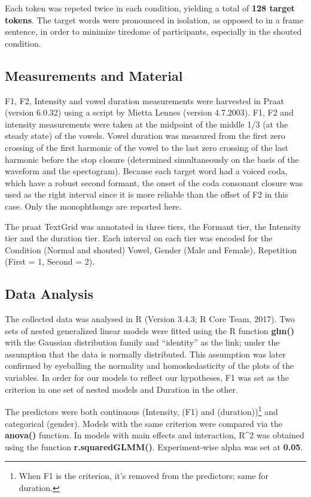 \documentclass[floatsintext,man]{apa6}
\theoremstyle{definition}
\theoremstyle{definition}
\theoremstyle{definition}
\theoremstyle{remark}
\begin{document}
Each token was repeted twice in each condition, yielding a total of
\textbf{128 target tokens}. The target words were pronounced in
isolation, as opposed to in a frame sentence, in order to minimize
tiredome of participants, especially in the shouted condition.

\subsection{Measurements and Material}\label{measurements-and-material}

F1, F2, Intensity and vowel duration measurements were harvested in
Praat (version 6.0.32) using a script by Mietta Lennes (version
4.7.2003). F1, F2 and intensity measurements were taken at the midpoint
of the middle 1/3 (at the steady state) of the vowels. Vowel duration
was measured from the first zero crossing of the first harmonic of the
vowel to the last zero crossing of the last harmonic before the stop
closure (determined simultaneously on the basis of the waveform and the
spectogram). Because each target word had a voiced coda, which have a
robust second formant, the onset of the coda consonant closure was used
as the right interval since it is more reliable than the offset of F2 in
this case. Only the monophthongs are reported here.

The praat TextGrid was annotated in three tiers, the Formant tier, the
Intensity tier and the duration tier. Each interval on each tier was
encoded for the Condition (Normal and shouted) Vowel, Gender (Male and
Female), Repetition (First = 1, Second = 2).

\subsection{Data Analysis}\label{data-analysis}

The collected data was analysed in R (Version 3.4.3; R Core Team, 2017).
Two sets of nested generalized linear models were fitted using the R
function \textbf{glm()} with the Gaussian distribution family and
\enquote{identity} as the link; under the assumption that the data is
normally distributed. This assumption was later confirmed by eyeballing
the normality and homoskedasticity of the plots of the variables. In
order for our models to reflect our hypotheses, F1 was set as the
criterion in one set of nested models and Duration in the other.

The predictors were both continuous (Intensity, (F1) and
(duration))\footnote{When F1 is the criterion, it's removed from the predictors; same for duration.}
and categorical (gender). Models with the same criterion were compared
via the \textbf{anova()} function. In models with main effects and
interaction, R\^{}2 was obtained using the function
\textbf{r.squaredGLMM()}. Experiment-wise alpha was set at
\textbf{0.05}.
\end{document}
